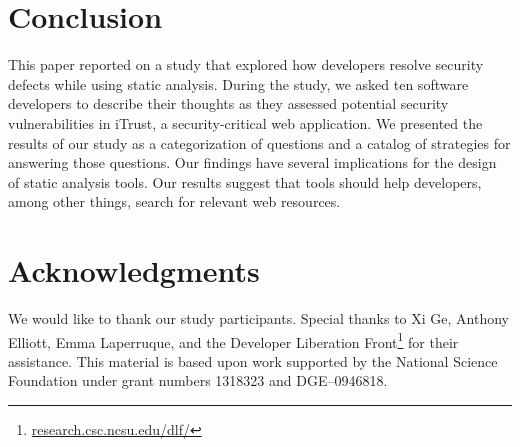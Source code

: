 \documentclass[10pt,journal,compsoc]{IEEEtran}
\newcommand{\blind}[1]{#1}
\begin{document}
\section{Conclusion}
\label{sec:concl}
This paper reported on a study that explored how developers resolve security defects while using static analysis.
During the study, we asked ten software developers to describe their thoughts as they assessed potential security vulnerabilities in iTrust, a security-critical web application.
We presented the results of our study as a categorization of questions and a catalog of strategies for answering those questions.
Our findings have several implications for the design of static analysis tools. 
Our results suggest that tools should help developers, among other things, search for relevant web resources.


\section*{Acknowledgments}

We would like to thank our study participants. 
Special thanks to Xi Ge, Anthony Elliott, Emma Laperruque, and the Developer Liberation Front\footnote{\blind{\url{research.csc.ncsu.edu/dlf/}}} for their assistance. 
This material is based upon work supported by the National Science Foundation under grant numbers 1318323 and DGE--0946818.



%
\end{document}
